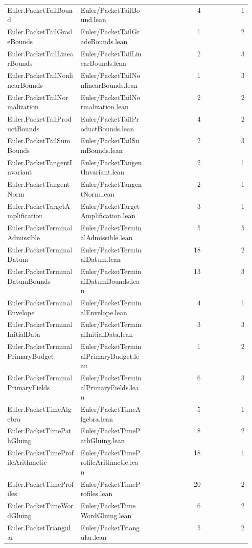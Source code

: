 \begin{longtable}{p{0.30\linewidth}p{0.28\linewidth}rr}
Euler.PacketTailBound & Euler/PacketTailBound.lean & 4 & 1\\
Euler.PacketTailGradeBounds & Euler/PacketTailGradeBounds.lean & 1 & 2\\
Euler.PacketTailLinearBounds & Euler/PacketTailLinearBounds.lean & 2 & 3\\
Euler.PacketTailNonlinearBounds & Euler/PacketTailNonlinearBounds.lean & 1 & 3\\
Euler.PacketTailNormalization & Euler/PacketTailNormalization.lean & 2 & 2\\
Euler.PacketTailProductBounds & Euler/PacketTailProductBounds.lean & 4 & 2\\
Euler.PacketTailSumBounds & Euler/PacketTailSumBounds.lean & 2 & 3\\
Euler.PacketTangentInvariant & Euler/PacketTangentInvariant.lean & 2 & 1\\
Euler.PacketTangentNorm & Euler/PacketTangentNorm.lean & 2 & 1\\
Euler.PacketTargetAmplification & Euler/PacketTargetAmplification.lean & 3 & 1\\
Euler.PacketTerminalAdmissible & Euler/PacketTerminalAdmissible.lean & 5 & 5\\
Euler.PacketTerminalDatum & Euler/PacketTerminalDatum.lean & 18 & 2\\
Euler.PacketTerminalDatumBounds & Euler/PacketTerminalDatumBounds.lean & 13 & 3\\
Euler.PacketTerminalEnvelope & Euler/PacketTerminalEnvelope.lean & 4 & 1\\
Euler.PacketTerminalInitialData & Euler/PacketTerminalInitialData.lean & 3 & 3\\
Euler.PacketTerminalPrimaryBudget & Euler/PacketTerminalPrimaryBudget.lean & 1 & 2\\
Euler.PacketTerminalPrimaryFields & Euler/PacketTerminalPrimaryFields.lean & 6 & 3\\
Euler.PacketTimeAlgebra & Euler/PacketTimeAlgebra.lean & 5 & 1\\
Euler.PacketTimePathGluing & Euler/PacketTimePathGluing.lean & 8 & 2\\
Euler.PacketTimeProfileArithmetic & Euler/PacketTimeProfileArithmetic.lean & 18 & 1\\
Euler.PacketTimeProfiles & Euler/PacketTimeProfiles.lean & 20 & 2\\
Euler.PacketTimeWordGluing & Euler/PacketTimeWordGluing.lean & 6 & 2\\
Euler.PacketTriangular & Euler/PacketTriangular.lean & 5 & 2\\

\end{longtable}
